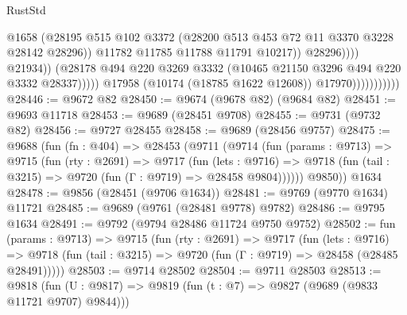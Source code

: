 \begin{lexlean}{RustStd}
\begin{coremodule}
                                                @1658
                                                (@28195
                                                  @515
                                                  @102
                                                  @3372
                                                  (@28200
                                                    @513
                                                    @453
                                                    @72
                                                    @11
                                                    @3370
                                                    @3228
                                                    @28142
                                                    @28296))
                                                @11782
                                                @11785
                                                @11788
                                                @11791
                                                @10217))
                                            @28296))))
                                    @21934))
                                (@28178
                                  @494
                                  @220
                                  @3269
                                  @3332
                                  (@10465 @21150 @3296 @494 @220 @3332 @28337)))))
                          @17958
                          (@10174 (@18785 @1622 @12608))
                          @17970)))))))))))
@28446 := @9672 @82
@28450 := @9674 (@9678 @82) (@9684 @82)
@28451 := @9693 @11718
@28453 := @9689 (@28451 @9708)
@28455 := @9731 (@9732 @82)
@28456 := @9727 @28455
@28458 := @9689 (@28456 @9757)
@28475 := @9688
    (fun (fn : @404) =>
    @28453
      (@9711
        (@9714
          (fun (params : @9713) =>
          @9715
            (fun (rty : @2691) =>
            @9717
              (fun (lets : @9716) =>
              @9718 (fun (tail : @3215) => @9720 (fun (Γ : @9719) => @28458 @9804))))))
        @9850))
    @1634
@28478 := @9856 (@28451 (@9706 @1634))
@28481 := @9769 (@9770 @1634) @11721
@28485 := @9689 (@9761 (@28481 @9778) @9782)
@28486 := @9795 @1634
@28491 := @9792 (@9794 @28486 @11724 @9750 @9752)
@28502 := fun (params : @9713) =>
  @9715
    (fun (rty : @2691) =>
    @9717
      (fun (lets : @9716) =>
      @9718 (fun (tail : @3215) => @9720 (fun (Γ : @9719) => @28458 (@28485 @28491)))))
@28503 := @9714 @28502
@28504 := @9711 @28503
@28513 := @9818
    (fun (U : @9817) => @9819 (fun (t : @7) => @9827 (@9689 (@9833 @11721 @9707) @9844)))

\end{coremodule}
\end{lexlean}
